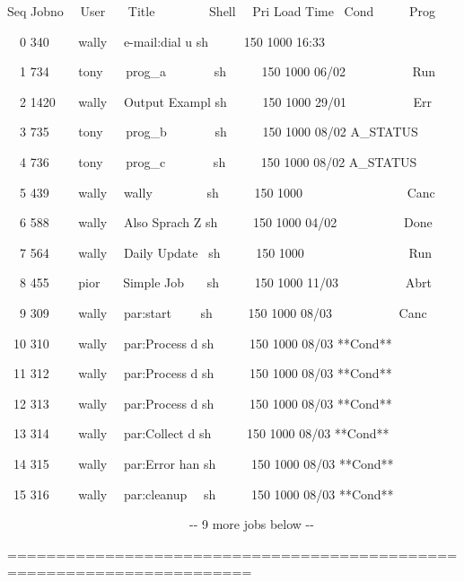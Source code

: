 \begin{exparasmall}

Seq Jobno \ \ User \ \ \ Title \ \ \ \ \ \ \ \ Shell \ \ Pri Load Time
\ Cond \ \ \ \ \ Prog

\ \ 0 340 \ \ \ \ wally \ \ e-mail:dial u sh \ \ \ \ \ 150 1000 16:33

\ \ 1 734 \ \ \ \ tony \ \ \ prog\_a \ \ \ \ \ \ \ sh \ \ \ \ \ 150 1000
06/02 \ \ \ \ \ \ \ \ \ \ Run

\ \ 2 1420 \ \ \ wally \ \ Output Exampl sh \ \ \ \ \ 150 1000 29/01
\ \ \ \ \ \ \ \ \ \ Err

\ \ 3 735 \ \ \ \ tony \ \ \ prog\_b \ \ \ \ \ \ \ sh \ \ \ \ \ 150 1000
08/02 A\_STATUS

\ \ 4 736 \ \ \ \ tony \ \ \ prog\_c \ \ \ \ \ \ \ sh \ \ \ \ \ 150 1000
08/02 A\_STATUS

\ \ 5 439 \ \ \ \ wally \ \ wally \ \ \ \ \ \ \ \ sh \ \ \ \ \ 150 1000
\ \ \ \ \ \ \ \ \ \ \ \ \ \ \ \ Canc

\ \ 6 588 \ \ \ \ wally \ \ Also Sprach Z sh \ \ \ \ \ 150 1000 04/02
\ \ \ \ \ \ \ \ \ \ Done

\ \ 7 564 \ \ \ \ wally \ \ Daily Update \ sh \ \ \ \ \ 150 1000
\ \ \ \ \ \ \ \ \ \ \ \ \ \ \ \ Run

\ \ 8 455 \ \ \ \ pior \ \ \ Simple Job \ \ \ sh \ \ \ \ \ 150 1000
11/03 \ \ \ \ \ \ \ \ \ \ Abrt

\ \ 9 309 \ \ \ \ wally \ \ par:start \ \ \ \ sh \ \ \ \ \ 150 1000
08/03 \ \ \ \ \ \ \ \ \ \ Canc

\ 10 310 \ \ \ \ wally \ \ par:Process d sh \ \ \ \ \ 150 1000 08/03
**Cond**

\ 11 312 \ \ \ \ wally \ \ par:Process d sh \ \ \ \ \ 150 1000 08/03
**Cond**

\ 12 313 \ \ \ \ wally \ \ par:Process d sh \ \ \ \ \ 150 1000 08/03
**Cond**

\ 13 314 \ \ \ \ wally \ \ par:Collect d sh \ \ \ \ \ 150 1000 08/03
**Cond**

\ 14 315 \ \ \ \ wally \ \ par:Error han sh \ \ \ \ \ 150 1000 08/03
**Cond**

\ 15 316 \ \ \ \ wally \ \ par:cleanup \ \ sh \ \ \ \ \ 150 1000 08/03
**Cond**

\ \ \ \ \ \ \ \ \ \ \ \ \ \ \ \ \ \ \ \ \ \ \ \ \ \ \ \ \ {}-{}- 9 more
jobs below -{}-

=======================================================================

\end{exparasmall}

